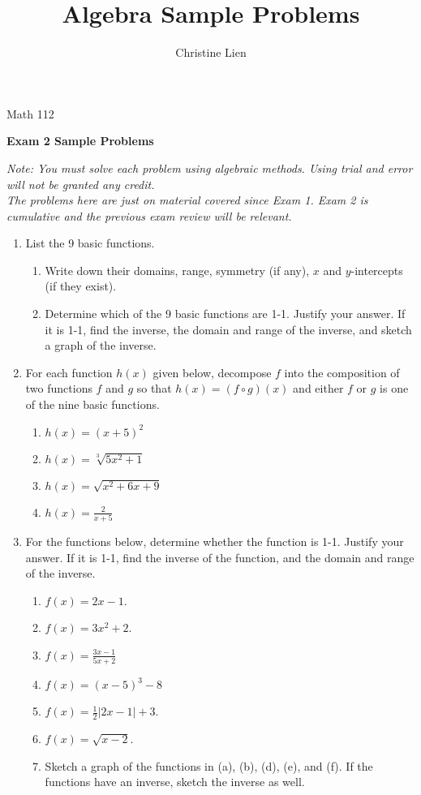 \documentclass{ximera}
\title{Algebra Sample Problems}
\author{Christine Lien}
\begin{document}
\hfill Math 112 

{\large\bf Exam 2 Sample Problems} 

\textit{Note: You must solve each problem using algebraic methods. Using trial and error will not be granted any credit.
\\
The problems here are just on material covered since Exam 1. Exam 2 is cumulative and the previous exam review will be relevant.}

\begin{enumerate}

\item List the 9 basic functions. 
\begin{enumerate}
\item Write down their domains, range, symmetry (if any), $x$ and $y$-intercepts (if they exist). \item Determine which of the 9 basic functions are 1-1. Justify your answer. If it is 1-1, find the inverse, the domain and range of the inverse, and sketch a graph of the inverse.  
\end{enumerate}

\item For each function $h(x)$ given below, decompose $f$ into the composition of two functions $f$ and $g$ so that $h(x)=(f\circ g)(x)$ and either $f$ or $g$ is one of the nine basic functions.
\begin{enumerate}
\item $h(x)=(x+5)^2$
\item $h(x)=\sqrt[3]{5x^2+1}$
\item $h(x)=\sqrt{x^2+6x+9}$
\item $\displaystyle h(x)= \frac{2}{x+5}$
\end{enumerate}


\item For the functions below, determine whether the function is 1-1. Justify your answer. If it is 1-1, find the inverse of the function, and the domain and range of the inverse. 

\begin{enumerate}
\item $f(x)=2x-1$.
\item $f(x)=3x^{2}+2$.
\item $\displaystyle f(x)=\frac{3x-1}{5x+2}$
\item $f(x)=(x-5)^{3}-8$
\item $\displaystyle f(x)=\frac{1}{2}|2x-1|+3$.
\item $f(x)=\sqrt{x-2}$.
\item Sketch a graph of the functions in (a), (b), (d), (e), and (f). If the functions have an inverse, sketch the inverse as well. 
\end{enumerate}


\end{enumerate}
\end{document}
